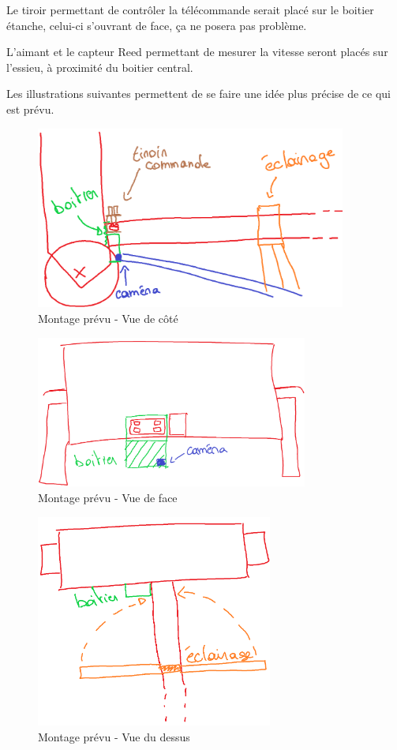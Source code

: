 Le tiroir permettant de contrôler la télécommande serait placé sur le boitier étanche, celui-ci s'ouvrant de face, ça ne posera pas problème.

L'aimant et le capteur Reed permettant de mesurer la vitesse seront placés sur l'essieu, à proximité du boitier central.

Les illustrations suivantes permettent de se faire une idée plus précise de ce qui est prévu.

\begin{figure}[H]
    \centering
    \includegraphics[height=6cm]{assets/figures/montage1.png}
    \caption{Montage prévu - Vue de côté}
\end{figure}

\begin{figure}[H]
    \centering
    \includegraphics[height=5cm]{assets/figures/montage2.png}
    \caption{Montage prévu - Vue de face}
\end{figure}
\newpage
\begin{figure}[H]
    \centering
    \includegraphics[height=7cm]{assets/figures/montage3.png}
    \caption{Montage prévu - Vue du dessus}
\end{figure}

